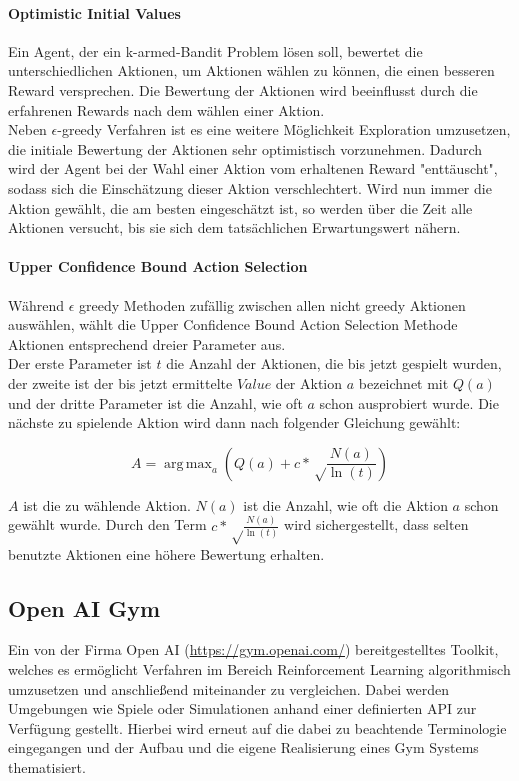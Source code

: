 \documentclass[11pt]{scrartcl}
\DeclareMathOperator*{\argmax}{arg\,max}
\begin{document}
\paragraph{Optimistic Initial Values}
Ein Agent, der ein k-armed-Bandit Problem lösen soll, bewertet die unterschiedlichen
Aktionen, um Aktionen wählen zu können, die einen besseren Reward versprechen. Die
Bewertung der Aktionen wird beeinflusst durch die erfahrenen Rewards nach dem wählen einer
Aktion.\\
Neben $\epsilon$-greedy Verfahren ist es eine weitere Möglichkeit Exploration umzusetzen,
die initiale Bewertung der Aktionen sehr optimistisch vorzunehmen. Dadurch wird der Agent
bei der Wahl einer Aktion vom erhaltenen Reward "enttäuscht", sodass sich die Einschätzung
dieser Aktion verschlechtert. Wird nun immer die Aktion gewählt, die am besten
eingeschätzt ist, so werden über die Zeit alle Aktionen versucht, bis sie sich dem
tatsächlichen Erwartungswert nähern.

\paragraph{Upper Confidence Bound Action Selection}
Während $\epsilon$ greedy Methoden zufällig zwischen allen nicht greedy Aktionen
auswählen, wählt die Upper Confidence Bound Ac\-tion Selection Methode Aktionen entsprechend
dreier Parameter aus.\\
Der erste Parameter ist $t$ die Anzahl der Aktionen, die bis jetzt gespielt wurden, der
zweite ist der bis jetzt ermittelte $Value$ der Aktion $a$ bezeichnet mit $Q(a)$ und der
dritte Parameter ist die Anzahl, wie oft $a$ schon ausprobiert wurde. Die nächste zu
spielende Aktion wird dann nach folgender Gleichung gewählt:

\[ A = \argmax_a\left( Q(a) + c*\sqrt\frac{N(a)}{\ln(t)} \right) \]

\noindent
$A$ ist die zu wählende Aktion. $N(a)$ ist die Anzahl, wie oft die Aktion $a$ schon
gewählt wurde. Durch den Term $c*\sqrt\frac{N(a)}{\ln(t)}$ wird sichergestellt, dass
selten benutzte Aktionen eine höhere Bewertung erhalten.


\newpage
\subsection{Open AI Gym}
Ein von der Firma Open AI (\url{https://gym.openai.com/}) bereitgestelltes Toolkit,
welches es ermöglicht Verfahren im Bereich Reinforcement Learning algorithmisch umzusetzen
und anschließend miteinander zu vergleichen. Dabei werden Umgebungen wie Spiele oder
Simulationen anhand einer definierten API zur Verfügung gestellt. Hierbei wird erneut auf
die dabei zu beachtende Terminologie eingegangen und der Aufbau und die eigene
Realisierung eines Gym Systems thematisiert.
\end{document}
